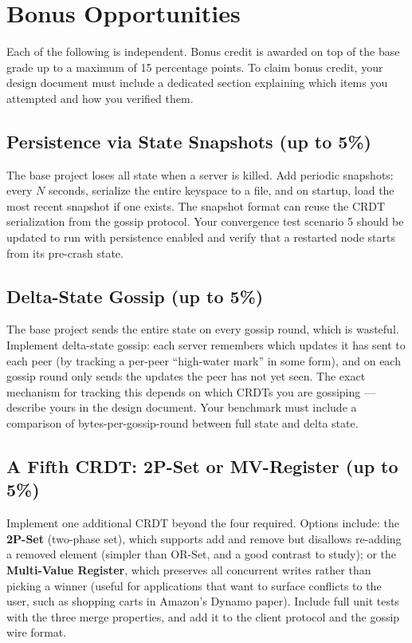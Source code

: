 \documentclass[11pt,a4paper]{article}
\begin{document}
\section{Bonus Opportunities}

Each of the following is independent. Bonus credit is awarded on top of the base grade up to a maximum of 15 percentage points. To claim bonus credit, your design document must include a dedicated section explaining which items you attempted and how you verified them.

\subsection{Persistence via State Snapshots (up to 5\%)}
The base project loses all state when a server is killed. Add periodic snapshots: every $N$ seconds, serialize the entire keyspace to a file, and on startup, load the most recent snapshot if one exists. The snapshot format can reuse the CRDT serialization from the gossip protocol. Your convergence test scenario 5 should be updated to run with persistence enabled and verify that a restarted node starts from its pre-crash state.

\subsection{Delta-State Gossip (up to 5\%)}
The base project sends the entire state on every gossip round, which is wasteful. Implement delta-state gossip: each server remembers which updates it has sent to each peer (by tracking a per-peer ``high-water mark'' in some form), and on each gossip round only sends the updates the peer has not yet seen. The exact mechanism for tracking this depends on which CRDTs you are gossiping --- describe yours in the design document. Your benchmark must include a comparison of bytes-per-gossip-round between full state and delta state.

\subsection{A Fifth CRDT: 2P-Set or MV-Register (up to 5\%)}
Implement one additional CRDT beyond the four required. Options include: the \textbf{2P-Set} (two-phase set), which supports add and remove but disallows re-adding a removed element (simpler than OR-Set, and a good contrast to study); or the \textbf{Multi-Value Register}, which preserves all concurrent writes rather than picking a winner (useful for applications that want to surface conflicts to the user, such as shopping carts in Amazon's Dynamo paper). Include full unit tests with the three merge properties, and add it to the client protocol and the gossip wire format.
\end{document}
